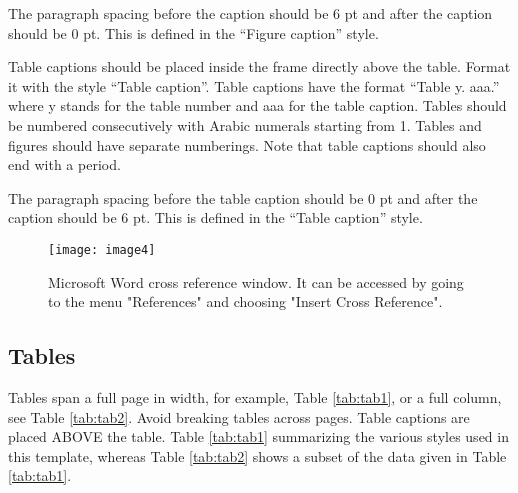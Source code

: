 \documentclass[final]{imeko_acta}
\begin{document}
The paragraph spacing before the caption should be 6 pt and after the caption should be 0 pt. This is defined in the “Figure caption” style. 

Table captions should be placed inside the frame directly above the table. Format it with the style “Table caption”. Table captions have the format “Table y. aaa.” where y stands for the table number and aaa for the table caption. Tables should be numbered consecutively with Arabic numerals starting from 1. Tables and figures should have separate numberings. Note that table captions should also end with a period. 

The paragraph spacing before the table caption should be 0 pt and after the caption should be 6 pt. This is defined in the “Table caption” style. 


\begin{figure}[!b]
	\centering
	\texttt{[image: image4]}
	\caption{Microsoft Word cross reference window. It can be accessed by going to the menu "References" and choosing "Insert Cross Reference".}
	\label{fig:image4}
\end{figure}

\subsection{Tables}

Tables span a full page in width, for example, Table \ref{tab:tab1}, or a full column, see Table \ref{tab:tab2}. Avoid breaking tables across pages.
Table captions are placed ABOVE the table. 
Table \ref{tab:tab1} summarizing the various styles used in this template, whereas Table \ref{tab:tab2} shows a subset of the data given in Table \ref{tab:tab1}.
\end{document}

